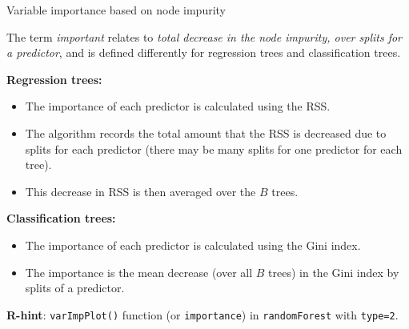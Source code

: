 \documentclass[10pt,ignorenonframetext,]{beamer}
\providecommand{\tightlist}{%
  \setlength{\itemsep}{0pt}\setlength{\parskip}{0pt}}
\begin{document}
\begin{frame}[fragile]

\begin{block}{Variable importance based on node impurity}

\vspace{1mm}

The term \emph{important} relates to \emph{total decrease in the node
impurity, over splits for a predictor}, and is defined differently for
regression trees and classification trees.

\vspace{4mm}

\textbf{Regression trees:}

\begin{itemize}
\tightlist
\item
  The importance of each predictor is calculated using the RSS.
\item
  The algorithm records the total amount that the RSS is decreased due
  to splits for each predictor (there may be many splits for one
  predictor for each tree).
\item
  This decrease in RSS is then averaged over the \(B\) trees.
\end{itemize}

\vspace{1mm} \textbf{Classification trees:}

\begin{itemize}
\tightlist
\item
  The importance of each predictor is calculated using the Gini index.
\item
  The importance is the mean decrease (over all \(B\) trees) in the Gini
  index by splits of a predictor.
\end{itemize}

\vspace{3mm} \textbf{R-hint}: \texttt{varImpPlot()} function (or
\texttt{importance}) in \texttt{randomForest} with \texttt{type=2}.

\end{block}

\end{frame}
\end{document}
